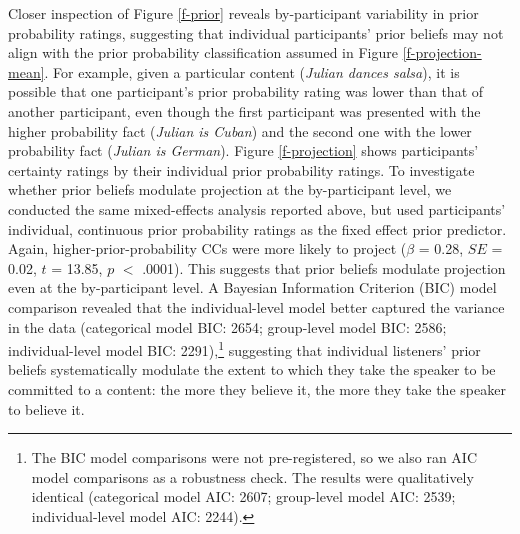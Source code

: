 \documentclass[OpenMind]{stjour}
\begin{document}
Closer inspection of  Figure \ref{f-prior} reveals by-participant variability in prior probability ratings, suggesting that individual participants' prior beliefs may not align with the prior probability classification assumed in  Figure \ref{f-projection-mean}. For example, given a particular content ({\em Julian dances salsa}), it is possible that one participant's prior probability rating was lower than that of another participant, even though the first participant was presented with the higher probability fact ({\em Julian is Cuban}) and the second one with the lower probability fact ({\em Julian is German}). Figure \ref{f-projection} shows participants' certainty ratings by their individual prior probability ratings. %
To investigate whether prior beliefs modulate projection at the by-participant level,  we conducted the same mixed-effects analysis reported above, but used participants' individual, continuous prior probability ratings as the fixed effect prior predictor. Again, higher-prior-probability CCs were more likely to project ($\beta$ = 0.28, $SE$ = 0.02, $t$ = 13.85, $p$ $<$ .0001). This  suggests that prior beliefs modulate projection even at the by-participant level. A Bayesian Information Criterion (BIC) model comparison  revealed that the individual-level model better captured the variance in the data (categorical model BIC: 2654; group-level model BIC: 2586; individual-level model BIC: 2291),\footnote{The BIC model comparisons were not pre-registered, so we also ran AIC model comparisons as a robustness check. The results were qualitatively identical (categorical model AIC: 2607; group-level model AIC: 2539; individual-level model AIC: 2244).} suggesting that individual listeners' prior beliefs systematically modulate the extent to which they take the speaker to be committed to a content: the more they believe it, the more they take the speaker to believe it.
\end{document}
